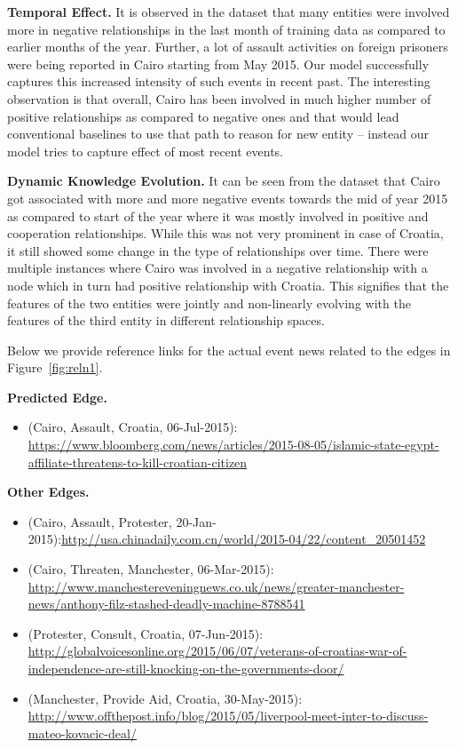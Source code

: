 \documentclass{article}
\begin{document}
{\bf Temporal Effect.} It is observed in the dataset that many entities were involved more in negative relationships in the last month of training data as compared to earlier months of the year. Further, a lot of assault activities on foreign prisoners were being reported in Cairo starting from May 2015. Our model successfully captures this increased intensity of such events in recent past. The interesting observation is that overall, Cairo has been involved in much higher number of positive relationships as compared to negative ones and that would lead conventional baselines to use that path to reason for new entity -- instead our model tries to capture effect of most recent events. 

{\bf Dynamic Knowledge Evolution.} It can be seen from the dataset that Cairo got associated with more and more negative events towards the mid of year 2015 as compared to start of the year where it was mostly involved in positive and cooperation relationships. While this was not very prominent in case of Croatia, it still showed some change in the type of relationships over time. There were multiple instances where Cairo was involved in a negative relationship with a node which in turn had positive relationship with Croatia. This signifies that the features of the two entities were jointly and non-linearly evolving with the features of the third entity in different relationship spaces.


Below we provide reference links for the actual event news related to the edges in Figure~\ref{fig:reln1}.

{\bf Predicted Edge.}
\begin{itemize}
\item (Cairo, Assault, Croatia, 06-Jul-2015): \url{https://www.bloomberg.com/news/articles/2015-08-05/islamic-state-egypt-affiliate-threatens-to-kill-croatian-citizen}
\end{itemize}
{\bf Other Edges.}
\begin{itemize}
\item (Cairo, Assault, Protester, 20-Jan-2015):\url{http://usa.chinadaily.com.cn/world/2015-04/22/content\_20501452}
\item (Cairo, Threaten, Manchester, 06-Mar-2015): \url{http://www.manchestereveningnews.co.uk/news/greater-manchester-news/anthony-filz-stashed-deadly-machine-8788541}
\item (Protester, Consult, Croatia, 07-Jun-2015): 
\url{http://globalvoicesonline.org/2015/06/07/veterans-of-croatias-war-of-independence-are-still-knocking-on-the-governments-door/}
\item (Manchester, Provide Aid, Croatia, 30-May-2015): 
\url{http://www.offthepost.info/blog/2015/05/liverpool-meet-inter-to-discuss-mateo-kovacic-deal/} 
\end{itemize}
\end{document}

